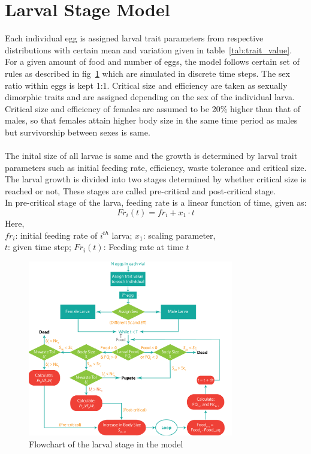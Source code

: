 \section{Larval Stage Model}
Each individual egg is assigned larval trait parameters from respective distributions with certain mean and variation given in table~\ref{tab:trait_value}. For a given amount of food and number of eggs, the model follows certain set of rules as described in fig~\ref{fig:larval_model} which are simulated in discrete time steps. The sex ratio within eggs is kept 1:1. Critical size and efficiency are taken as sexually dimorphic traits and are assigned depending on the sex of the individual larva. Critical size and efficiency of females are assumed to be 20\% higher than that of males, so that females attain higher body size in the same time period as males but survivorship between sexes is same. \citep{joshiGeneticsLarvalUrea1996,testaSexSpecificWeightLoss2013}\\ \\
The inital size of all larvae is same and the growth is determined by larval trait parameters such as initial feeding rate, efficiency, waste tolerance and critical size. The larval growth is divided into two stages determined by whether critical size is reached or not, These stages are called pre-critical and post-critical stage. \\
In pre-critical stage of the larva, feeding rate is a linear function of time, given as:
\[Fr_{i}(t) = fr_{i} + x_{1}\cdot t\]
Here, \\
$fr_{i}$: initial feeding rate of $i^{th}$ larva; $x_{1}$: scaling parameter, \\
$t$: given time step; $Fr_{i}(t)$: Feeding rate at time $t$\\
\begin{figure}[h]
  \centering
  \includegraphics[width=0.8\textwidth]{C2/Figs/larval_model}
  \caption{Flowchart of the larval stage in the model}
  \label{fig:larval_model}
\end{figure}

